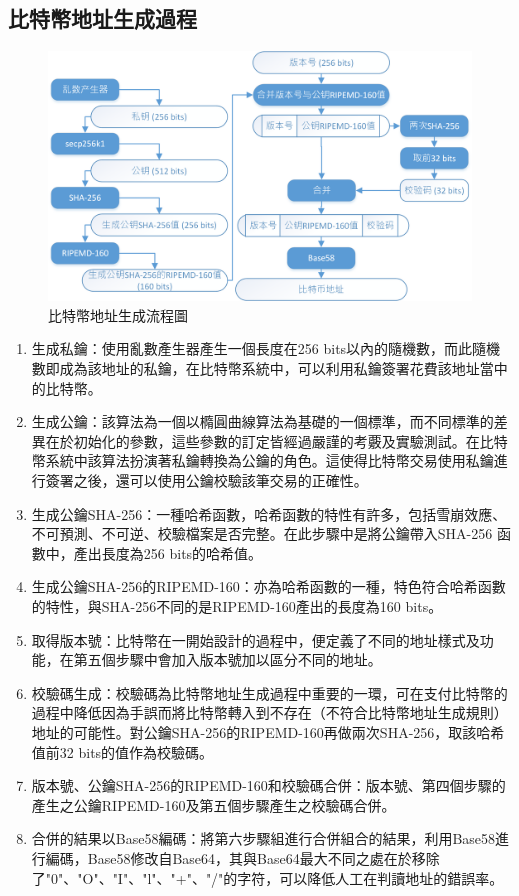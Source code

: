 		\subsection{比特幣地址生成過程}

		\begin{figure}[htbp]
				\centering
				\includegraphics[width = .9\textwidth]{address.png}
				\caption{比特幣地址生成流程圖}\label{address}
		\end{figure}

		\begin{enumerate}
			\item 生成私鑰：使用亂數產生器產生一個長度在256 bits以內的隨機數，而此隨機數即成為該地址的私鑰，在比特幣系統中，可以利用私鑰簽署花費該地址當中的比特幣。
			\item 生成公鑰：該算法為一個以橢圓曲線算法為基礎的一個標準，而不同標準的差異在於初始化的參數，這些參數的訂定皆經過嚴謹的考覈及實驗測試。在比特幣系統中該算法扮演著私鑰轉換為公鑰的角色。這使得比特幣交易使用私鑰進行簽署之後，還可以使用公鑰校驗該筆交易的正確性。
			\item 生成公鑰SHA-256：一種哈希函數，哈希函數的特性有許多，包括雪崩效應、不可預測、不可逆、校驗檔案是否完整。在此步驟中是將公鑰帶入SHA-256 函數中，產出長度為256 bits的哈希值。
			\item 生成公鑰SHA-256的RIPEMD-160：亦為哈希函數的一種，特色符合哈希函數的特性，與SHA-256不同的是RIPEMD-160產出的長度為160 bits。
			\item 取得版本號：比特幣在一開始設計的過程中，便定義了不同的地址樣式及功能，在第五個步驟中會加入版本號加以區分不同的地址。
			\item 校驗碼生成：校驗碼為比特幣地址生成過程中重要的一環，可在支付比特幣的過程中降低因為手誤而將比特幣轉入到不存在（不符合比特幣地址生成規則）地址的可能性。對公鑰SHA-256的RIPEMD-160再做兩次SHA-256，取該哈希值前32 bits的值作為校驗碼。
			\item 版本號、公鑰SHA-256的RIPEMD-160和校驗碼合併：版本號、第四個步驟的產生之公鑰RIPEMD-160及第五個步驟產生之校驗碼合併。
			\item 合併的結果以Base58編碼：將第六步驟組進行合併組合的結果，利用Base58進行編碼，Base58修改自Base64，其與Base64最大不同之處在於移除了"0"、"O"、"I"、"l"、"+"、"/"的字符，可以降低人工在判讀地址的錯誤率。
		\end{enumerate}

